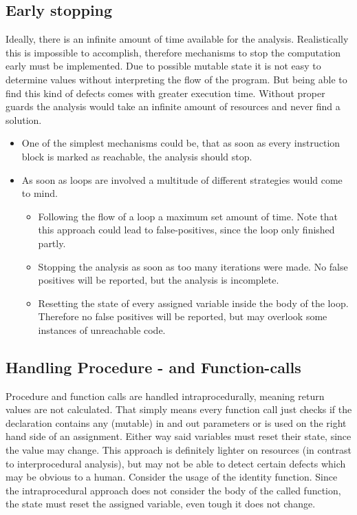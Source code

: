 \subsection{Early stopping}
\label{sub:early stopping}
Ideally, there is an infinite amount of time available for the analysis. Realistically this is impossible to accomplish, therefore mechanisms to stop the computation early must be implemented.
Due to possible mutable state it is not easy to determine values without interpreting the flow of the program. 
But being able to find this kind of defects comes with greater execution time. Without proper guards the analysis would take an infinite amount of resources and never find a solution.
\begin{itemize}
	\item One of the simplest mechanisms could be, that as soon as every instruction block is marked as reachable, the analysis should stop.
	\item As soon as loops are involved a multitude of different strategies would come to mind. 
	\begin{itemize}
		\item Following the flow of a loop a maximum set amount of time. Note that this approach could lead to false-positives, since the loop only finished partly. 
		\item Stopping the analysis as soon as too many iterations were made. No false positives will be reported, but the analysis is incomplete.
		\item Resetting the state of every assigned variable inside the body of the loop. Therefore no false positives will be reported, but may overlook some instances of unreachable code.
	\end{itemize}
\end{itemize}

\subsection{Handling Procedure - and Function-calls}
\label{sub:handling procedure and function calls}
Procedure and function calls are handled intraprocedurally, meaning return values are not calculated. That simply means every function call just checks if the declaration contains any (mutable) in and out parameters or is used on the right hand side of an assignment.
Either way said variables must reset their state, since the value may change. 
This approach is definitely lighter on resources (in contrast to interprocedural analysis), but may not be able to detect certain defects which may be obvious to a human. Consider the usage of the identity function. Since the intraprocedural approach does not consider the body of the called function, the state must reset the assigned variable, even tough it does not change.


